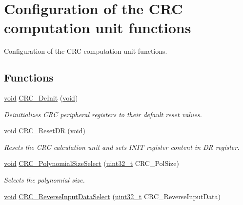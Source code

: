 \hypertarget{group___c_r_c___group1}{\section{Configuration of the C\-R\-C computation unit functions}
\label{group___c_r_c___group1}
}


Configuration of the C\-R\-C computation unit functions.  


\subsection*{Functions}
\begin{DoxyCompactItemize}
\item 
\hyperlink{group___n_a_m_e_ga18028b8badbf1ea7e704ccac3c488e82}{void} \hyperlink{group___c_r_c___group1_ga11f30b83f52bd9eafec8c174244ae07e}{C\-R\-C\-\_\-\-De\-Init} (\hyperlink{group___n_a_m_e_ga18028b8badbf1ea7e704ccac3c488e82}{void})
\begin{DoxyCompactList}\small\item\em Deinitializes C\-R\-C peripheral registers to their default reset values. \end{DoxyCompactList}\item 
\hyperlink{group___n_a_m_e_ga18028b8badbf1ea7e704ccac3c488e82}{void} \hyperlink{group___c_r_c___group1_ga506467d5ef873a5a4ade4ae83cb110f6}{C\-R\-C\-\_\-\-Reset\-D\-R} (\hyperlink{group___n_a_m_e_ga18028b8badbf1ea7e704ccac3c488e82}{void})
\begin{DoxyCompactList}\small\item\em Resets the C\-R\-C calculation unit and sets I\-N\-I\-T register content in D\-R register. \end{DoxyCompactList}\item 
\hyperlink{group___n_a_m_e_ga18028b8badbf1ea7e704ccac3c488e82}{void} \hyperlink{group___c_r_c___group1_ga205113706234c9c85b075ef8f22b8d51}{C\-R\-C\-\_\-\-Polynomial\-Size\-Select} (\hyperlink{stdint_8h_a435d1572bf3f880d55459d9805097f62}{uint32\-\_\-t} C\-R\-C\-\_\-\-Pol\-Size)
\begin{DoxyCompactList}\small\item\em Selects the polynomial size. \end{DoxyCompactList}\item 
\hyperlink{group___n_a_m_e_ga18028b8badbf1ea7e704ccac3c488e82}{void} \hyperlink{group___c_r_c___group1_ga3d28d3b5d3d933e2c43ad1233aa7fc85}{C\-R\-C\-\_\-\-Reverse\-Input\-Data\-Select} (\hyperlink{stdint_8h_a435d1572bf3f880d55459d9805097f62}{uint32\-\_\-t} C\-R\-C\-\_\-\-Reverse\-Input\-Data)

\end{DoxyCompactItemize}

